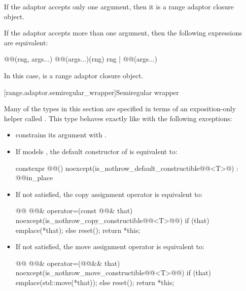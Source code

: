 \pnum
If the adaptor accepts only one argument, then it is a range adaptor closure
object.

\pnum
If the adaptor accepts more than one argument, then the following expressions
are equivalent:

\begin{codeblock}
@@(rng, args...)
@@(args...)(rng)
rng | @@(args...)
\end{codeblock}

In this case,  is a  range adaptor
closure object.

[range.adaptor.semiregular_wrapper]{Semiregular wrapper}

\pnum
Many of the types in this section are specified in terms of an exposition-only
helper called . This type behaves exactly
like  with the following exceptions:

\begin{itemize}
\item {} constrains its argument
with .

\item If  models , the default
constructor of  is equivalent to:
\begin{codeblock}
constexpr @@()
  noexcept(is_nothrow_default_constructible@@<T>@)
  : @@{in_place}
{ }
\end{codeblock}

\item If 
   not
satisfied, the copy assignment operator is equivalent to:
\begin{codeblock}
@@ @@& operator=(const @@& that)
  noexcept(is_nothrow_copy_constructible@@<T>@@)
{
  if (that) emplace(*that);
  else reset();
  return *this;
}
\end{codeblock}

\item If 
   not satisfied,
the move assignment operator is equivalent to:
\begin{codeblock}
@@ @@& operator=(@@&& that)
  noexcept(is_nothrow_move_constructible@@<T>@@)
{
  if (that) emplace(std::move(*that));
  else reset();
  return *this;
}
\end{codeblock}
\end{itemize}

